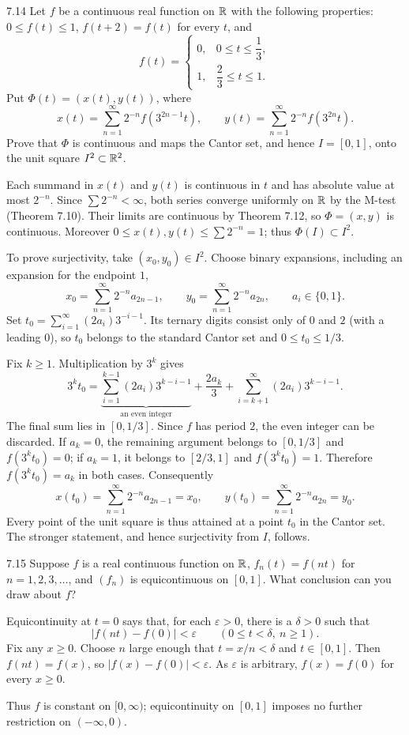 \documentclass[11pt, oneside]{article}
\begin{document}
\begin{exercise}{7.14}
Let $f$ be a continuous real function on $\mathbb{R}$ with the following properties: $0\le f(t)\le1$, $f(t+2)=f(t)$ for every $t$, and
\[
 f(t)=\begin{cases}
 0, &0\le t\le\dfrac13, \\
 1, &\dfrac23\le t\le1.
 \end{cases}
\]
Put $\Phi(t)=(x(t), y(t))$, where
\[
 x(t)=\sum_{n=1}^{\infty}2^{-n}f(3^{2n-1}t), \qquad
 y(t)=\sum_{n=1}^{\infty}2^{-n}f(3^{2n}t).
\]
Prove that $\Phi$ is continuous and maps the Cantor set, and hence $I=[0, 1]$, onto the unit square $I^2\subset\mathbb{R}^2$.
\end{exercise}
\begin{solution}
Each summand in $x(t)$ and $y(t)$ is continuous in $t$ and has absolute value at most $2^{-n}$. Since $\sum2^{-n}<\infty$, both series converge uniformly on $\mathbb{R}$ by the M-test (Theorem 7.10). Their limits are continuous by Theorem 7.12, so $\Phi=(x, y)$ is continuous. Moreover $0\le x(t), y(t)\le\sum2^{-n}=1$; thus $\Phi(I)\subset I^2$.

To prove surjectivity, take $(x_0, y_0)\in I^2$. Choose binary expansions, including an expansion for the endpoint $1$,
\[
 x_0=\sum_{n=1}^{\infty}2^{-n}a_{2n-1}, \qquad
 y_0=\sum_{n=1}^{\infty}2^{-n}a_{2n}, \qquad a_i\in\{0, 1\}.
\]
Set $t_0=\sum_{i=1}^{\infty}(2a_i)3^{-i-1}$. Its ternary digits consist only of $0$ and $2$ (with a leading $0$), so $t_0$ belongs to the standard Cantor set and $0\le t_0\le1/3$.

Fix $k\ge1$. Multiplication by $3^k$ gives
\[
 3^k t_0=\underbrace{\sum_{i=1}^{k-1}(2a_i)3^{k-i-1}}_{\text{an even integer}}
 +\frac{2a_k}{3}+\sum_{i=k+1}^{\infty}(2a_i)3^{k-i-1}.
\]
The final sum lies in $[0, 1/3]$. Since $f$ has period $2$, the even integer can be discarded. If $a_k=0$, the remaining argument belongs to $[0, 1/3]$ and $f(3^kt_0)=0$; if $a_k=1$, it belongs to $[2/3, 1]$ and $f(3^kt_0)=1$. Therefore $f(3^kt_0)=a_k$ in both cases. Consequently
\[
 x(t_0)=\sum_{n=1}^{\infty}2^{-n}a_{2n-1}=x_0,
 \qquad y(t_0)=\sum_{n=1}^{\infty}2^{-n}a_{2n}=y_0.
\]
Every point of the unit square is thus attained at a point $t_0$ in the Cantor set. The stronger statement, and hence surjectivity from $I$, follows.
\end{solution}

\begin{exercise}{7.15}
Suppose $f$ is a real continuous function on $\mathbb{R}$, $f_n(t)=f(nt)$ for $n=1, 2, 3, \ldots$, and $(f_n)$ is equicontinuous on $[0, 1]$. What conclusion can you draw about $f$?
\end{exercise}
\begin{solution}
Equicontinuity at $t=0$ says that, for each $\varepsilon>0$, there is a $\delta>0$ such that
\[
 |f(nt)-f(0)|<\varepsilon\qquad(0\le t<\delta, \ n\ge1).
\]
Fix any $x\ge0$. Choose $n$ large enough that $t=x/n<\delta$ and $t\in[0, 1]$. Then $f(nt)=f(x)$, so $|f(x)-f(0)|<\varepsilon$. As $\varepsilon$ is arbitrary, $f(x)=f(0)$ for every $x\ge0$.

Thus $f$ is constant on $[0, \infty)$; equicontinuity on $[0, 1]$ imposes no further restriction on $(-\infty, 0)$.
\end{solution}
\end{document}
